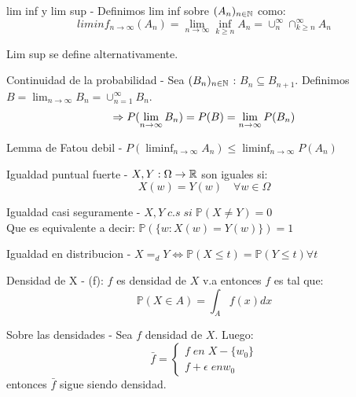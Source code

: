 \begin{Definition}{lim inf y lim sup}
    - Definimos lim inf sobre $(A_n)_{n \in \mathbb{N}}$ como:
    $${liminf}_{n \to \infty} (A_n) = \lim_{n \to \infty} \inf_{k \geq n} A_n = \cup_{n}^\infty \cap_{k \geq n}^\infty A_n $$
\end{Definition} 
Lim sup se define alternativamente.

\begin{Lemma}{Continuidad de la probabilidad}
    - Sea $(B_n)_{n \in \mathbb{N}}$ : $B_n \subseteq B_{n+1}$. Definimos $B = \lim_{n \to \infty} B_n = \cup_{n=1}^\infty B_n$.
    $$\Rightarrow P(\lim_{n \to \infty} B_n) = P(B) = \lim_{n \to \infty} P(B_n)$$
\end{Lemma}

\begin{Lemma}{Lemma de Fatou debil}
    - $P(\liminf_{n \to \infty} A_n) \leq \liminf_{n \to \infty} P(A_n)$
\end{Lemma}

\begin{Definition}{Igualdad puntual fuerte}
    - $X, Y: \Omega \to \mathbb{R} $ son iguales si:
    $$ X(w) = Y(w) \quad \forall w \in \Omega $$
\end{Definition}

\begin{Definition}{Igualdad casi seguramente}
    - $X, Y \; c.s \; si \; \mathbb{P}(X \neq Y) = 0 $ \\
    Que es equivalente a decir:
    $ \mathbb{P} ( \{ w: X(w) = Y(w)\}) = 1$
\end{Definition}


\begin{Definition}{Igualdad en distribucion}
    - $X =_d Y \iff \mathbb{P}(X \leq t) = \mathbb{P}(Y \leq t) \forall t $
\end{Definition}

\begin{Definition}{Densidad de X}
    - (f): $f$ es densidad de $X$ v.a entonces $f$ es tal que:
    $$ \mathbb{P}(X \in A) = \int_A f(x) dx $$
\end{Definition}

\begin{Proposition}{Sobre las densidades}
    - Sea $f$ densidad de $X$. Luego:
    $$ \bar{f} = \begin{cases}
        f \; en \; X - \{ w_0\} \\
        f + \epsilon \; en w_0
    \end{cases}$$
    entonces $\bar{f}$ sigue siendo densidad.
\end{Proposition}


